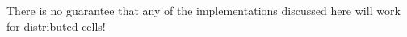 \documentclass[10pt]{article}
\numberwithin{equation}{section} %
\begin{document}
\color{magenta}
There is no guarantee that any of the implementations discussed here will work for distributed cells!
\color{black}

\end{document}
